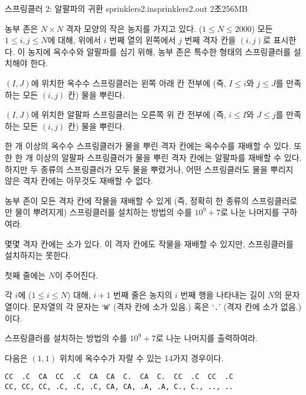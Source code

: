 \begin{problem}{스프링클러 2: 알팔파의 귀환}
	{sprinklers2.in}{sprinklers2.out}
	{2초}{256MB}{}
	
	농부 존은 $N \times N$ 격자 모양의 작은 농지를 가지고 있다. ($1 \le N \le 2000$) 모든 $1 \le i, j \le N$에 대해, 위에서 $i$ 번째 열의 왼쪽에서 $j$ 번째 격자 칸을 $(i, j)$로 표시한다. 이 농지에 옥수수와 알팔파를 심기 위해, 농부 존은 특수한 형태의 스프링클러를 설치해야 한다.
	
	$(I, J)$에 위치한 옥수수 스프링클러는 왼쪽 아래 칸 전부에 (즉, $I \le i$와 $j \le J$를 만족하는 모든 $(i, j)$ 칸) 물을 뿌린다.
	
	$(I, J)$에 위치한 알팔파 스프링클러는 오른쪽 위 칸 전부에 (즉, $i \le I$와 $J \le j$를 만족하는 모든 $(i, j)$ 칸) 물을 뿌린다.
	
	한 개 이상의 옥수수 스프링클러가 물을 뿌린 격자 칸에는 옥수수를 재배할 수 있다. 또한 한 개 이상의 알팔파 스프링클러가 물을 뿌린 격자 칸에는 알팔파를 재배할 수 있다. 하지만 두 종류의 스프링클러가 모두 물을 뿌렸거나, 어떤 스프링클러도 물을 뿌리지 않은 격자 칸에는 아무것도 재배할 수 없다.
	
	농부 존이 모든 격자 칸에 작물을 재배할 수 있게 (즉, 정확히 한 종류의 스프링클러로만 물이 뿌려지게) 스프링클러를 설치하는 방법의 수를 $10^9+7$로 나눈 나머지를 구하여라.
	
	몇몇 격자 칸에는 소가 있다. 이 격자 칸에도 작물을 재배할 수 있지만, 스프링클러를 설치하지는 못한다.
	
	\InputFile
	
	첫째 줄에는 $N$이 주어진다.
	
	각 $i$에 ($1 \le i \le N$) 대해, $i+1$ 번째 줄은 농지의 $i$ 번째 행을 나타내는 길이 $N$의 문자열이다. 문자열의 각 문자는 `\texttt{W}' (격자 칸에 소가 있음.) 혹은 `\texttt{.}' (격자 칸에 소가 없음.)이다.
	
	\OutputFile
	
	스프링클러를 설치하는 방법의 수를 $10^9+7$로 나눈 나머지를 출력하여라.
	
	
	\Example
		
	\begin{example}
	\end{example}
	
	다음은 $(1, 1)$ 위치에 옥수수가 자랄 수 있는 14가지 경우이다.

	\begin{verbatim}
CC  .C  CA  CC  .C  CA  CA  C.  CA  C.  CC  .C  CC  .C  
CC, CC, CC, .C, .C, .C, CA, CA, .A, .A, C., C., .., ..
	\end{verbatim}
	

\end{problem}
